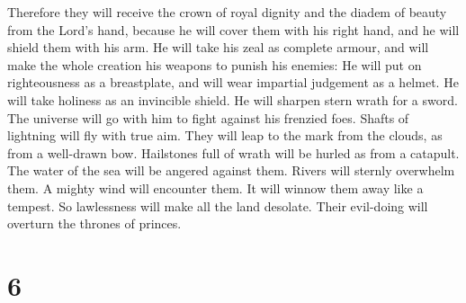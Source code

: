 Therefore they will receive the crown of royal dignity and the diadem of
beauty from the Lord's hand, because he will cover them with his right
hand, and he will shield them with his arm.  He will take
his zeal as complete armour, and will make the whole creation his
weapons to punish his enemies:  He will put on
righteousness as a breastplate, and will wear impartial judgement as a
helmet.  He will take holiness as an invincible shield.
 He will sharpen stern wrath for a sword. The universe will
go with him to fight against his frenzied foes.  Shafts of
lightning will fly with true aim. They will leap to the mark from the
clouds, as from a well-drawn bow.  Hailstones full of wrath
will be hurled as from a catapult. The water of the sea will be angered
against them. Rivers will sternly overwhelm them.  A mighty
wind will encounter them. It will winnow them away like a tempest. So
lawlessness will make all the land desolate. Their evil-doing will
overturn the thrones of princes.

\hypertarget{section-4}{%
\section{6}\label{section-4}}

